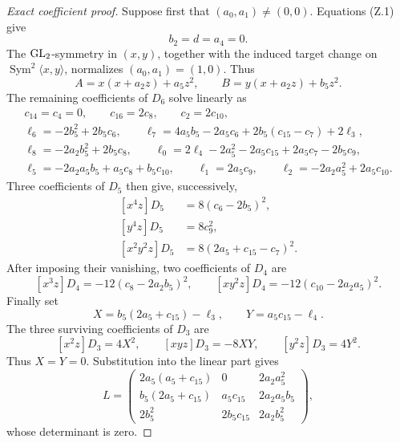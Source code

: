 \begin{proof}[Exact coefficient proof]
Suppose first that \((a_0,a_1)\ne(0,0)\).  Equations (Z.1) give
\[
 b_2=d=a_4=0.
\]
The \(\operatorname{GL}_2\)-symmetry in \((x,y)\), together with the induced target
change on \(\operatorname{Sym}^2\langle x,y\rangle\), normalizes
\((a_0,a_1)=(1,0)\).  Thus
\[
 A=x(x+a_2z)+a_5z^2,\qquad
 B=y(x+a_2z)+b_5z^2.
\]
The remaining coefficients of \(D_6\) solve linearly as
\[
\begin{gathered}
 c_{14}=c_4=0,\qquad c_{16}=2c_8,\qquad c_2=2c_{10},\\
 \ell_6=-2b_5^2+2b_5c_6,\qquad
 \ell_7=4a_5b_5-2a_5c_6+2b_5(c_{15}-c_7)+2\ell_3,\\
 \ell_8=-2a_2b_5^2+2b_5c_8,\qquad
 \ell_0=2\ell_4-2a_5^2-2a_5c_{15}+2a_5c_7-2b_5c_9,\\
 \ell_5=-2a_2a_5b_5+a_5c_8+b_5c_{10},\qquad
 \ell_1=2a_5c_9,\qquad
 \ell_2=-2a_2a_5^2+2a_5c_{10}.
\end{gathered}
\]
Three coefficients of \(D_5\) then give, successively,
\[
\begin{aligned}
[x^4z]D_5&=8(c_6-2b_5)^2,\\
[y^4z]D_5&=8c_9^2,\\
[x^2y^2z]D_5&=8(2a_5+c_{15}-c_7)^2.
\end{aligned}
\]
After imposing their vanishing, two coefficients of \(D_4\) are
\[
 [x^3z]D_4=-12(c_8-2a_2b_5)^2,\qquad
 [xy^2z]D_4=-12(c_{10}-2a_2a_5)^2.
\]
Finally set
\[
 X=b_5(2a_5+c_{15})-\ell_3,\qquad
 Y=a_5c_{15}-\ell_4.
\]
The three surviving coefficients of \(D_3\) are
\[
 [x^2z]D_3=4X^2,\qquad
 [xyz]D_3=-8XY,\qquad
 [y^2z]D_3=4Y^2.
\]
Thus \(X=Y=0\).  Substitution into the linear part gives
\[
L=
\begin{pmatrix}
2a_5(a_5+c_{15})&0&2a_2a_5^2\\
b_5(2a_5+c_{15})&a_5c_{15}&2a_2a_5b_5\\
2b_5^2&2b_5c_{15}&2a_2b_5^2
\end{pmatrix},
\]
whose determinant is zero.


\end{proof}
